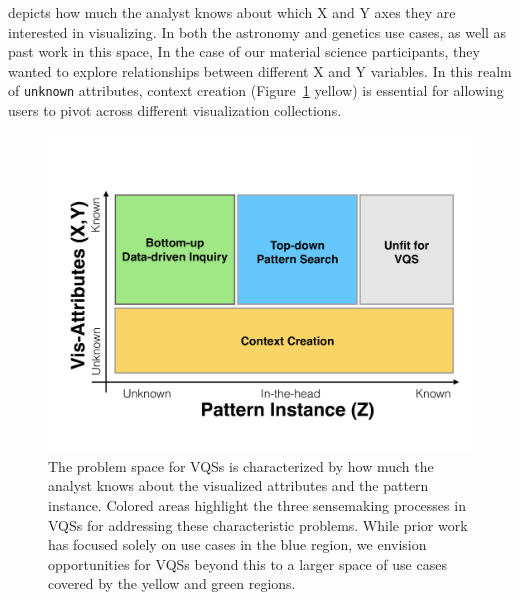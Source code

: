 depicts how much the analyst
knows about which X and Y axes
they are interested in visualizing.
In both the astronomy and genetics use cases,
as well as past work in this space,  In the case of our material science participants, they wanted to explore relationships between different
X and Y variables. In this realm of \texttt{unknown} attributes, context creation (Figure~\ref{2dmodel} yellow) is
essential for allowing users to pivot across different visualization collections.%
\begin{figure}[h!]
  \centering
  \includegraphics[width=0.9\linewidth]{figures/2dmodel.pdf}
  \caption{The problem space for VQSs is characterized by how much the analyst knows about the visualized attributes and the pattern instance. Colored areas highlight the three sensemaking processes in VQSs for addressing these characteristic problems. While prior work has focused solely on use cases in the blue region, we envision opportunities for VQSs beyond this to a larger space of use cases covered by the yellow and green regions.}
  \label{2dmodel}
  \vspace{-10pt}
\end{figure}

